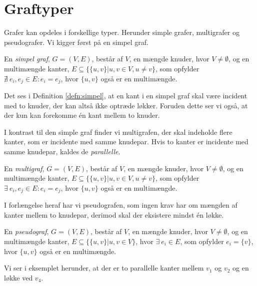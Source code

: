 \section{Graftyper}
Grafer kan opdeles i forskellige typer. Herunder simple grafer, multigrafer og pseudografer. Vi kigger først på en simpel graf.

\begin{defn} \label{defn:simpel}
En \emph{simpel graf}, $G=(V,E)$, består af $V$, en mængde knuder, hvor $V \neq \emptyset$, og en multimængde kanter, $E \subseteq \{\{u,v\}|u,v \in V, u \neq v\}$, som opfylder $\nexists \ e_i, e_j \in E : e_i = e_j$, hvor $\{u,v\}$ også er en multimængde.
\end{defn}

Det ses i Definition \autoref{defn:simpel}, at en kant i en simpel graf skal være incident med to knuder, der kan altså ikke optræde løkker. Foruden dette ser vi også, at der kun kan forekomme én kant mellem to knuder.



I kontrast til den simple graf finder vi multigrafen, der skal indeholde flere kanter, som er incidente med samme knudepar. Hvis to kanter er incidente med samme knudepar, kaldes de \emph{parallelle}.

\begin{defn}[Multigraf] \label{defn:multi}
En \emph{multigraf}, $ G = (V,E)$, består af $V$, en mængde knuder, hvor $V \neq \emptyset$, og en multimængde kanter,
$E \subseteq \{\{u,v\}|u,v \in V, u \neq v\}$, som opfylder $\exists \ e_i, e_j \in E : e_i = e_j$, hvor $\{u,v\}$ også er en multimængde.
\end{defn}



I forlængelse heraf har vi pseudografen, som ingen krav har om mængden af kanter mellem to knudepar, derimod skal der eksistere mindst én løkke. 

\begin{defn}[Pseudograf] \label{defn:pseudo}
En \emph{pseudograf}, $ G = (V,E)$, består af $V$, en mængde knuder, hvor $V \neq \emptyset$, og en multimængde kanter, $E \subseteq \{\{u,v\}|u,v \in V\}$, hvor $\exists \ e_i \in E$, som opfylder $e_i = \{v\}$, hvor $\{u,v\}$ også er en multimængde.
\end{defn}

Vi ser i eksemplet herunder, at der er to parallelle kanter mellem $v_{1}$ og $v_{2}$ og en løkke ved $v_{4}$.

